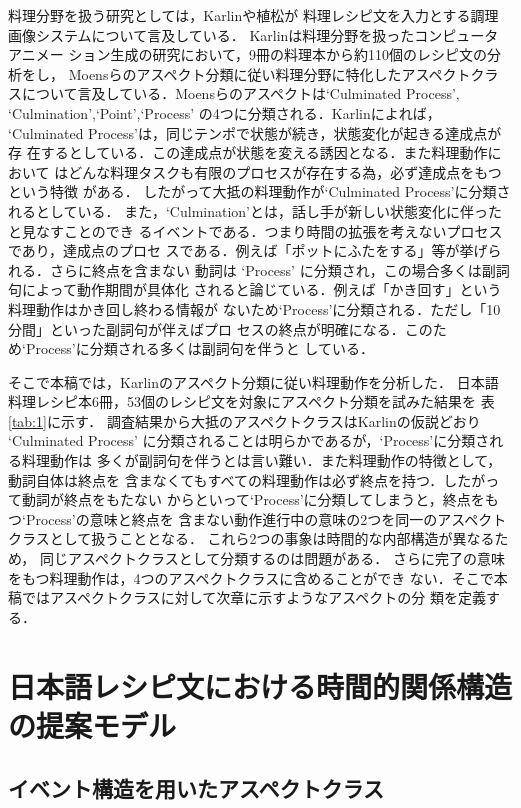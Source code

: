 料理分野を扱う研究としては，Karlin\cite{karlin}や植松\cite{uematu}が
料理レシピ文を入力とする調理画像システムについて言及している．
Karlinは料理分野を扱ったコンピュータアニメー
ション生成の研究において，9冊の料理本から約110個のレシピ文の分析をし，
Moensら\cite{moens}のアスペクト分類に従い料理分野に特化したアスペクトクラ
スについて言及している．Moensらのアスペクトは`Culminated Process',
`Culmination',`Point',`Process' の4つに分類される．Karlinによれば，
`Culminated Process'は，同じテンポで状態が続き，状態変化が起きる達成点が存
在するとしている．この達成点が状態を変える誘因となる．また料理動作において
はどんな料理タスクも有限のプロセスが存在する為，必ず達成点をもつという特徴
がある．
したがって大抵の料理動作が`Culminated Process'に分類されるとしている．
また，`Culmination'とは，話し手が新しい状態変化に伴ったと見なすことのでき
るイベントである．つまり時間の拡張を考えないプロセスであり，達成点のプロセ
スである．例えば「ポットにふたをする」等が挙げられる．さらに終点を含まない
動詞は `Process' に分類され，この場合多くは副詞句によって動作期間が具体化
されると論じている．例えば「かき回す」という料理動作はかき回し終わる情報が
ないため`Process'に分類される．ただし「10分間」といった副詞句が伴えばプロ
セスの終点が明確になる．このため`Process'に分類される多くは副詞句を伴うと
している．


そこで本稿では，Karlinのアスペクト分類に従い料理動作を分析した．
日本語料理レシピ本6冊，53個のレシピ文を対象にアスペクト分類を試みた結果を
表\ref{tab:1}に示す．
調査結果から大抵のアスペクトクラスはKarlinの仮説どおり `Culminated
Process' に分類されることは明らかであるが，`Process'に分類される料理動作は
多くが副詞句を伴うとは言い難い．また料理動作の特徴として，動詞自体は終点を
含まなくてもすべての料理動作は必ず終点を持つ．したがって動詞が終点をもたない
からといって`Process'に分類してしまうと，終点をもつ`Process'の意味と終点を
含まない動作進行中の意味の2つを同一のアスペクトクラスとして扱うこととなる．
これら2つの事象は時間的な内部構造が異なるため，
同じアスペクトクラスとして分類するのは問題がある．
さらに完了の意味をもつ料理動作は，4つのアスペクトクラスに含めることができ
ない．そこで本稿ではアスペクトクラスに対して次章に示すようなアスペクトの分
類を定義する．


\section{日本語レシピ文における時間的関係構造の提案モデル}

\subsection{イベント構造を用いたアスペクトクラス}


